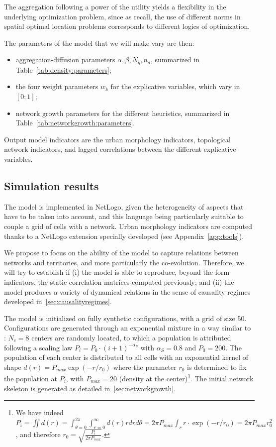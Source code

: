 

The aggregation following a power of the utility yields a flexibility in the underlying optimization problem, since as \cite{josselin2013revisiting} recall, the use of different norms in spatial optimal location problems corresponds to different logics of optimization.



The parameters of the model that we will make vary are then:
\begin{itemize}
	\item aggregation-diffusion parameters $\alpha,\beta,N_g,n_d$, summarized in Table~\ref{tab:density:parameters};
	\item the four weight parameters $w_k$ for the explicative variables, which vary in $[0;1]$;
	\item network growth parameters for the different heuristics, summarized in Table~\ref{tab:networkgrowth:parameters}.
\end{itemize}


Output model indicators are the urban morphology indicators, topological network indicators, and lagged correlations between the different explicative variables.


\subsection{Simulation results}

The model is implemented in NetLogo, given the heterogeneity of aspects that have to be taken into account, and this language being particularly suitable to couple a grid of cells with a network. Urban morphology indicators are computed thanks to a NetLogo extension specially developed (see Appendix~\ref{app:tools}).

We propose to focus on the ability of the model to capture relations between networks and territories, and more particularly the co-evolution. Therefore, we will try to establish if (i) the model is able to reproduce, beyond the form indicators, the static correlation matrices computed previously; and (ii) the model produces a variety of dynamical relations in the sense of causality regimes developed in~\ref{sec:causalityregimes}.


The model is initialized on fully synthetic configurations, with a grid of size $50$. Configurations are generated through an exponential mixture in a way similar to \cite{anas1998urban}: $N_c = 8$ centers are randomly located, to which a population is attributed following a scaling law $P_i = P_0\cdot (i+1)^{-\alpha_S}$ with $\alpha_S = 0.8$ and $P_0 = 200$. The population of each center is distributed to all cells with an exponential kernel of shape $d(r) = P_{max}\exp\left( - r / r_0\right)$ where the parameter $r_0$ is determined to fix the population at $P_i$, with $P_{max} = 20$ (density at the center)\footnote{We have indeed $P_i = \iint d(r) = \int_{\theta=0}^{2\pi} \int_{r=0}^{\infty} d(r) rdrd\theta = 2 \pi P_{max} \int_r r\cdot \exp\left( - r / r_0\right) = 2 \pi P_{max} r_0^2$, and therefore $r_0 = \sqrt{\frac{P_i}{2\pi P_{max}}}$.}. The initial network skeleton is generated as detailed in~\ref{sec:networkgrowth}.


